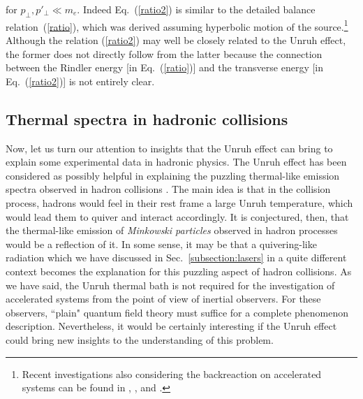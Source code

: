 \documentclass[12pt,nofootinbib,floatfix,aps,prd,showpacs,amsmath,amssymb,eqsecnum]{revtex4-2}
\begin{document}
for $p_\perp,p'_\perp \ll m_e$.
Indeed Eq.~(\ref{ratio2}) is similar to 
the detailed balance 
relation~(\ref{ratio}), which was derived assuming hyperbolic 
motion of the source.\footnote{Recent investigations also considering the
backreaction on accelerated systems can be found in 
\textcite{Parentani95}, \textcite{Parentanietal97}, 
\textcite{Gabrieletal98} and \textcite{Reznik98}.
                } Although the relation (\ref{ratio2}) may well be
closely related to the Unruh effect, the former 
does not directly follow from the latter because the connection between the
Rindler energy [in Eq.~(\ref{ratio})] and the transverse energy
[in Eq.~(\ref{ratio2})] is not entirely clear.


\subsection{Thermal spectra in hadronic collisions}
\label{subsection:hadrons}

Now, let us turn our attention to insights that the Unruh effect
can bring to explain some experimental data in hadronic physics. The 
Unruh effect has been considered as possibly helpful in explaining 
the puzzling thermal-like emission spectra observed in hadron 
collisions \cite{Barshayetal78, Barshayetal80, Kharzeev06}. 
The main idea is that in the collision process, hadrons would feel
in their rest frame a large Unruh temperature, which would lead them to 
quiver and interact accordingly. It is conjectured, then, that the 
thermal-like emission of {\em Minkowski particles} observed in hadron 
processes would be a reflection of it. In some sense, it may be
that a quivering-like radiation which we have discussed in 
Sec.~\ref{subsection:lasers} in a quite different context  
becomes the explanation for this puzzling aspect of hadron
collisions. As we have said, the Unruh thermal bath is not required 
for the investigation of accelerated systems from the point of view 
of inertial observers. For these observers, ``plain" quantum field 
theory must suffice for a complete phenomenon description. 
Nevertheless, it would be certainly interesting if the Unruh effect 
could bring new insights to the understanding of this problem.
\end{document}
